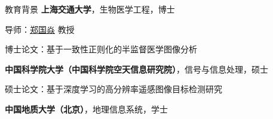 \begin{rubric}{教育背景}
\entry*[2019 -- 2024]%
	\textbf{上海交通大学}，生物医学工程，博士\par
 导师：\href{https://bme.sjtu.edu.cn/Web/FacultyDetail/124}{郑国焱} 教授\par
 博士论文：基于一致性正则化的半监督医学图像分析
	
%
\entry*[2015 -- 2018]%
	\textbf{中国科学院大学（中国科学院空天信息研究院）}，信号与信息处理，硕士\par
 硕士论文：基于深度学习的高分辨率遥感图像目标检测研究
	
% 
\entry*[2011 -- 2015]%
	\textbf{中国地质大学（北京）}，地理信息系统，学士



\end{rubric}
